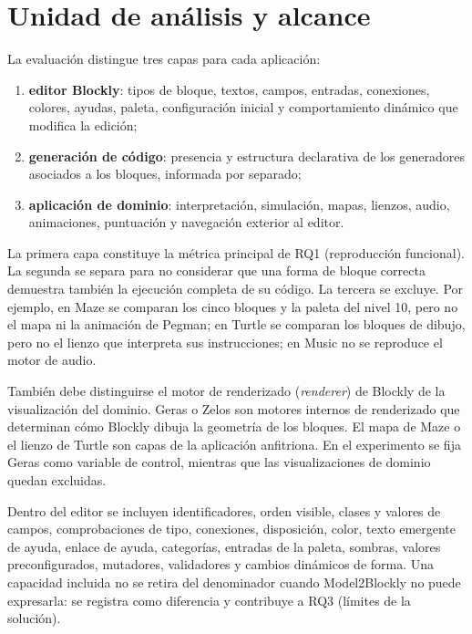 \section{Unidad de análisis y alcance}
\label{sec:alcance-evaluacion-externa}

La evaluación distingue tres capas para cada aplicación:

\begin{enumerate}
  \item \textbf{editor Blockly}: tipos de bloque, textos, campos, entradas,
  conexiones, colores, ayudas, paleta, configuración inicial y comportamiento
  dinámico que modifica la edición;
  \item \textbf{generación de código}: presencia y estructura declarativa de
  los generadores asociados a los bloques, informada por separado;
  \item \textbf{aplicación de dominio}: interpretación, simulación, mapas,
  lienzos, audio, animaciones, puntuación y navegación exterior al editor.
\end{enumerate}

La primera capa constituye la métrica principal de RQ1 (reproducción
funcional). La segunda se separa
para no considerar que una forma de bloque correcta demuestra también la
ejecución completa de su código. La tercera se excluye. Por ejemplo, en Maze se
comparan los cinco bloques y la paleta del nivel 10, pero no el mapa ni la
animación de Pegman; en Turtle se comparan los bloques de dibujo, pero no el
lienzo que interpreta sus instrucciones; en Music no se reproduce el motor de
audio.

También debe distinguirse el motor de renderizado (\emph{renderer}) de Blockly
de la visualización del dominio. Geras o Zelos son motores internos de
renderizado que determinan cómo Blockly dibuja
la geometría de los bloques. El mapa de Maze o el lienzo de Turtle son capas de
la aplicación anfitriona. En el experimento se fija Geras como variable de
control, mientras que las visualizaciones de dominio quedan excluidas.

Dentro del editor se incluyen identificadores, orden visible, clases y valores
de campos, comprobaciones de tipo, conexiones, disposición, color, texto
emergente de ayuda, enlace de ayuda, categorías, entradas de la paleta, sombras,
valores preconfigurados,
mutadores, validadores y cambios dinámicos de forma. Una capacidad incluida no
se retira del denominador cuando Model2Blockly no puede expresarla: se registra
como diferencia y contribuye a RQ3 (límites de la solución).

